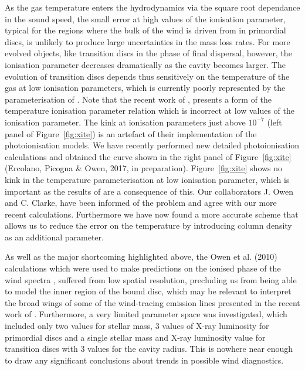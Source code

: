\documentclass[10pt,fleqn,twoside]{article}
\begin{document}
As the gas temperature enters the hydrodynamics via the square root
dependance in the sound speed, the small error at high values of the
ionisation parameter, typical for the regions where the bulk of the
wind is driven from in primordial discs, is unlikely to produce large
uncertainties in the mass loss rates. For more evolved objects, like
transition discs in the phase of final dispersal, however, the ionisation
parameter decreases dramatically as the cavity becomes larger. The
evolution of transition discs depends thus sensitively on the temperature
of the gas at low ionisation parameters, which is currently poorly
represented by the parameterisation of 
\citet{2008ApJ...688..398E, 2009ApJ...699.1639E}.
Note that the recent work of 
\citet{2016MNRAS.457.1905H},
presents a form of the temperature ionisation parameter relation which is incorrect at
low values of the ionisation parameter. The kink at ionisation
parameters just above $10^{-7}$ (left panel of Figure~\ref{fig:xite}) is an artefact of their implementation
of the photoionisation models. We have recently performed new detailed
photoionisation calculations and obtained the curve shown in the right
panel of Figure~\ref{fig:xite} (Ercolano, Picogna \& Owen, 2017, in preparation).
Figure~\ref{fig:xite} shows no kink in the temperature parameterisation at
low ionisation parameter, which is important as the results of
\citet{2016MNRAS.457.1905H} are a consequence of this.  Our
collaborators J. Owen and C. Clarke, have been informed of the problem
and agree with our more recent calculations. Furthermore we have now
found a more accurate scheme that allows us to reduce the error on the
temperature by introducing  column density as an additional
parameter. 

As well as the major shortcoming highlighted above, the Owen et
al. (2010) calculations which were used to make predictions on
the ionised phase of the wind spectra 
\citep{2010MNRAS.406.1553E, 2016MNRAS.460.3472E},
suffered from low spatial resolution,
precluding us from being able to model the inner region of the bound disc, which
may be relevant to interpret the broad wings of some of the
wind-tracing emission lines presented in the recent
work of 
\citet{2016ApJ...831..169S}.
Furthermore, a very limited
parameter space was investigated, which included only two values for
stellar mass, 3 values of X-ray luminosity for primordial discs and a
single stellar mass and X-ray luminosity value for transition discs
with 3 values for the cavity radius. This is nowhere near enough to draw any
significant conclusions about trends in possible wind diagnostics. 
\end{document}
